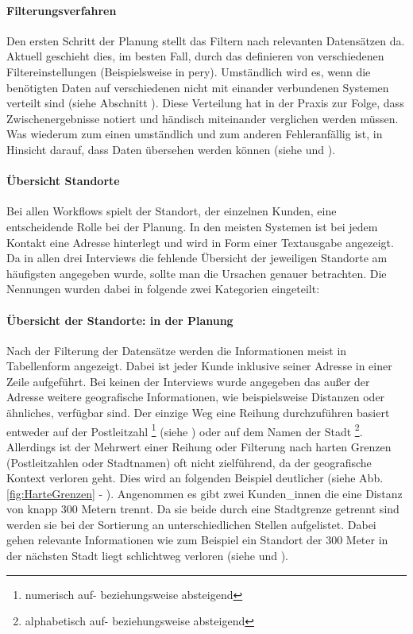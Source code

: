 \documentclass[Bachelorarbeit.tex]{subfiles}
\begin{document}
\paragraph{Filterungsverfahren}
\label{interviewsAnalyseFilterungsverfahren}
Den ersten Schritt der Planung stellt das Filtern nach relevanten Datensätzen da.
Aktuell geschieht dies, im besten Fall, durch das definieren von verschiedenen Filtereinstellungen (Beispielsweise in pery).
Umständlich wird es, wenn die benötigten Daten auf verschiedenen nicht mit einander verbundenen Systemen verteilt sind (siehe Abschnitt ). 
Diese Verteilung hat in der Praxis zur Folge, dass Zwischenergebnisse notiert und händisch miteinander verglichen werden müssen.
Was wiederum zum einen umständlich und zum anderen Fehleranfällig ist, in Hinsicht darauf, dass Daten übersehen werden können (siehe  und ).


\paragraph*{Übersicht Standorte}
\label{interviewsAnalyseStandorte}
Bei allen Workflows spielt der Standort, der einzelnen Kunden, eine entscheidende Rolle bei der Planung.
In den meisten Systemen ist bei jedem Kontakt eine Adresse hinterlegt und wird in Form einer Textausgabe angezeigt.
Da in allen drei Interviews die fehlende Übersicht der jeweiligen Standorte am häufigsten angegeben wurde, sollte man die Ursachen genauer betrachten. 
Die Nennungen wurden dabei in folgende zwei Kategorien eingeteilt:

\paragraph{Übersicht der Standorte: in der Planung}
Nach der Filterung der Datensätze werden die Informationen meist in Tabellenform angezeigt.
Dabei ist jeder Kunde inklusive seiner Adresse in einer Zeile aufgeführt.
Bei keinen der Interviews wurde angegeben das außer der Adresse weitere geografische Informationen, wie beispielsweise Distanzen oder ähnliches, verfügbar sind.
Der einzige Weg eine Reihung durchzuführen basiert entweder auf der Postleitzahl
\footnote{
	numerisch auf- beziehungsweise absteigend
	} 
(siehe ) oder auf dem Namen der Stadt
\footnote{
	alphabetisch auf- beziehungsweise absteigend
	}. 
Allerdings ist der Mehrwert einer Reihung oder Filterung nach harten Grenzen (Postleitzahlen oder Stadtnamen) oft nicht zielführend, da der geografische Kontext verloren geht.
Dies wird an folgenden Beispiel deutlicher (siehe Abb. \ref{fig:HarteGrenzen} -  ). 
Angenommen es gibt zwei Kunden\_innen die eine Distanz von knapp 300 Metern trennt. 
Da sie beide durch eine Stadtgrenze getrennt sind werden sie bei der Sortierung an unterschiedlichen Stellen aufgelistet.
Dabei gehen relevante Informationen wie zum Beispiel ein Standort der 300 Meter in der nächsten Stadt liegt schlichtweg verloren (siehe  und ). 
 
\end{document}
